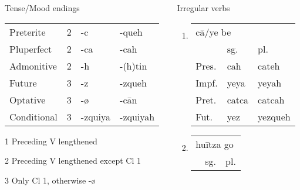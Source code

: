 \documentclass[12pt]{beamer}
\newcommand{\nah}[1]{\textcolor{nahgrn}{#1}}
\newcommand{\trs}[1]{\textcolor{nahblu}{#1}}
\begin{document}
\begin{frame}
\begin{columns}[t]
\begin{column}{.18\linewidth}
\begin{block}{Tense/Mood endings}
\begin{threeparttable}
\begin{tabular}{llll}
            Preterite   & 2 & \nah{-c}\tnote{3}  & \nah{-queh}            \\
            Pluperfect  & 2 & \nah{-ca}          & \nah{-cah}             \\
            Admonitive  & 2 & \nah{-h}\tnote{3}  & \nah{-(h)tin}\tnote{3} \\
            Future      & 3 & \nah{-z}           & \nah{-zqueh}           \\
            Optative    & 3 & \nah{-ø}           & \nah{-cān}             \\
            Conditional & 3 & \nah{-zquiya}      & \nah{-zquiyah}
          \end{tabular}
          \begin{tablenotes}
            \item[1] Preceding V lengthened
            \item[2] Preceding V lengthened except Cl 1
            \item[3] Only Cl 1, otherwise \nah{-ø}
          \end{tablenotes}
        \end{threeparttable}
      \end{block}
    \end{column}
    \begin{column}{.18\linewidth}
      \begin{block}{Irregular verbs}
        \begin{enumerate}
          \item \begin{tabular}[t]{lll}
                  \multicolumn{3}{l}{\nah{cā/ye} \trs{be}} \\
                        & sg.         & pl.                \\
                  Pres. & \nah{cah}   & \nah{cateh}        \\
                  Impf. & \nah{yeya}  & \nah{yeyah}        \\
                  Pret. & \nah{catca} & \nah{catcah}       \\
                  Fut.  & \nah{yez}   & \nah{yezqueh}      \\
                \end{tabular}%
          \item \begin{tabular}[t]{lll}
                  \multicolumn{3}{l}{\nah{huītza} \trs{go}} \\
                        & sg.          & pl.                \\

\end{tabular}
\end{enumerate}
\end{block}
\end{column}
\end{columns}
\end{frame}
\end{document}
